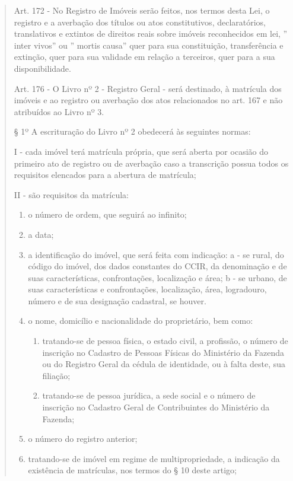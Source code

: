\documentclass[
  letterpaper,
]{report}
\providecommand{\tightlist}{%
  \setlength{\itemsep}{0pt}\setlength{\parskip}{0pt}}\usepackage{longtable,booktabs,array}
\begin{document}
\begin{quote}
Art. 172 - No Registro de Imóveis serão feitos, nos termos desta Lei, o
registro e a averbação dos títulos ou atos constitutivos, declaratórios,
translativos e extintos de direitos reais sobre imóveis reconhecidos em
lei, '' inter vivos'' ou '' mortis causa'' quer para sua constituição,
transferência e extinção, quer para sua validade em relação a terceiros,
quer para a sua disponibilidade.

Art. 176 - O Livro nº 2 - Registro Geral - será destinado, à matrícula
dos imóveis e ao registro ou averbação dos atos relacionados no art. 167
e não atribuídos ao Livro nº 3.

§ 1º A escrituração do Livro nº 2 obedecerá às seguintes normas:

I - cada imóvel terá matrícula própria, que será aberta por ocasião do
primeiro ato de registro ou de averbação caso a transcrição possua todos
os requisitos elencados para a abertura de matrícula;

II - são requisitos da matrícula:

\begin{enumerate}
\def\labelenumi{\arabic{enumi})}
\item
  o número de ordem, que seguirá ao infinito;
\item
  a data;
\item
  a identificação do imóvel, que será feita com indicação: a - se rural,
  do código do imóvel, dos dados constantes do CCIR, da denominação e de
  suas características, confrontações, localização e área; b - se
  urbano, de suas características e confrontações, localização, área,
  logradouro, número e de sua designação cadastral, se houver.
\item
  o nome, domicílio e nacionalidade do proprietário, bem como:

  \begin{enumerate}
  \def\labelenumii{\alph{enumii})}
  \tightlist
  \item
    tratando-se de pessoa física, o estado civil, a profissão, o número
    de inscrição no Cadastro de Pessoas Físicas do Ministério da Fazenda
    ou do Registro Geral da cédula de identidade, ou à falta deste, sua
    filiação;
  \item
    tratando-se de pessoa jurídica, a sede social e o número de
    inscrição no Cadastro Geral de Contribuintes do Ministério da
    Fazenda;
  \end{enumerate}
\item
  o número do registro anterior;
\item
  tratando-se de imóvel em regime de multipropriedade, a indicação da
  existência de matrículas, nos termos do § 10 deste artigo;
\end{enumerate}


\end{quote}
\end{document}
